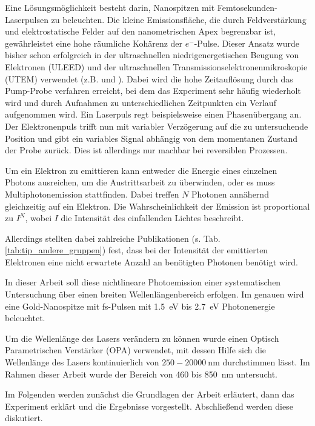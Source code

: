 \documentclass[bachelor,       %
               twoside,        %
               BCOR10mm,       %
               english,ngerman, %
               final,          %
               ]{GAUBM}
\begin{document}
Eine Lösungsmöglichkeit besteht darin, Nanospitzen mit Femtosekunden-Laserpulsen zu beleuchten.
Die kleine Emissionsfläche, die durch Feldverstärkung und elektrostatische Felder auf den nanometrischen Apex begrenzbar ist, gewährleistet eine hohe räumliche Kohärenz der $e^-$-Pulse.
Dieser Ansatz wurde bisher schon erfolgreich in der ultraschnellen niedrigenergetischen Beugung von Elektronen (ULEED) und der ultraschnellen Transmissionselektronenmikroskopie (UTEM) verwendet (z.B. \cite{gulde_ultrafast_2014} und \cite{barwick_4d_2008}).
Dabei wird die hohe Zeitauflösung durch das Pump-Probe verfahren erreicht, bei dem das Experiment sehr häufig wiederholt wird und durch Aufnahmen zu unterschiedlichen Zeitpunkten ein Verlauf aufgenommen wird.
Ein Laserpuls regt beispielsweise einen Phasenübergang an.
Der Elektronenpuls trifft nun mit variabler Verzögerung auf die zu untersuchende Position und gibt ein variables Signal abhängig von dem momentanen Zustand der Probe zurück.
Dies ist allerdings nur machbar bei reversiblen Prozessen.

Um ein Elektron zu emittieren kann entweder die Energie eines einzelnen Photons ausreichen, um die Austrittsarbeit zu überwinden, oder es muss Multiphotonemission stattfinden.
Dabei treffen $N$ Photonen annähernd gleichzeitig auf ein Elektron.
Die Wahrscheinlichkeit der Emission ist proportional zu $I^N$, wobei $I$ die Intensität des einfallenden Lichtes beschreibt.

Allerdings stellten dabei zahlreiche Publikationen (s. Tab. \ref{tab:tip_andere_gruppen}) fest, dass bei der Intensität der emittierten Elektronen eine nicht erwartete Anzahl an benötigten Photonen benötigt wird.

In dieser Arbeit soll diese nichtlineare Photoemission einer systematischen Untersuchung über einen breiten Wellenlängenbereich erfolgen. Im genauen wird eine Gold-Nanospitze mit fs-Pulsen mit \SI{1.5}{\eV} bis \SI{2.7}{\eV} Photonenergie beleuchtet.

Um die Wellenlänge des Lasers verändern zu können wurde einen Optisch Parametrischen Verstärker (OPA) verwendet, mit dessen Hilfe sich die Wellenlänge des Lasers kontinuierlich von $250-\SI{20000}{\nano\meter}$ durchstimmen lässt.
Im Rahmen dieser Arbeit wurde der Bereich von 460 bis \SI{850}{\nm} untersucht.\newline\newline

Im Folgenden werden zunächst die Grundlagen der Arbeit erläutert, dann das Experiment erklärt und die Ergebnisse vorgestellt. Abschließend werden diese diskutiert.
\end{document}

